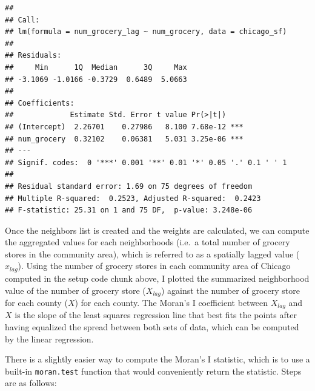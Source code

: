 \documentclass[
]{article}
\newenvironment{Shaded}{\begin{snugshade}}{\end{snugshade}}
\newcommand{\AttributeTok}[1]{\textcolor[rgb]{0.13,0.29,0.53}{#1}}
\newcommand{\CommentTok}[1]{\textcolor[rgb]{0.56,0.35,0.01}{\textit{#1}}}
\newcommand{\ConstantTok}[1]{\textcolor[rgb]{0.56,0.35,0.01}{#1}}
\newcommand{\FunctionTok}[1]{\textcolor[rgb]{0.13,0.29,0.53}{\textbf{#1}}}
\newcommand{\NormalTok}[1]{#1}
\newcommand{\OtherTok}[1]{\textcolor[rgb]{0.56,0.35,0.01}{#1}}
\newcommand{\SpecialCharTok}[1]{\textcolor[rgb]{0.81,0.36,0.00}{\textbf{#1}}}
\begin{document}
\begin{verbatim}
## 
## Call:
## lm(formula = num_grocery_lag ~ num_grocery, data = chicago_sf)
## 
## Residuals:
##     Min      1Q  Median      3Q     Max 
## -3.1069 -1.0166 -0.3729  0.6489  5.0663 
## 
## Coefficients:
##             Estimate Std. Error t value Pr(>|t|)    
## (Intercept)  2.26701    0.27986   8.100 7.68e-12 ***
## num_grocery  0.32102    0.06381   5.031 3.25e-06 ***
## ---
## Signif. codes:  0 '***' 0.001 '**' 0.01 '*' 0.05 '.' 0.1 ' ' 1
## 
## Residual standard error: 1.69 on 75 degrees of freedom
## Multiple R-squared:  0.2523, Adjusted R-squared:  0.2423 
## F-statistic: 25.31 on 1 and 75 DF,  p-value: 3.248e-06
\end{verbatim}

Once the neighbors list is created and the weights are calculated, we
can compute the aggregated values for each neighborhoods (i.e.~a total
number of grocery stores in the community area), which is referred to as
a spatially lagged value (\(x_{lag}\)). Using the number of grocery
stores in each community area of Chicago computed in the setup code
chunk above, I plotted the summarized neighborhood value of the number
of grocery store (\(X_{lag}\)) against the number of grocery store for
each county (\(X\)) for each county. The Moran's I coefficient between
\(X_{lag}\) and \(X\) is the slope of the least squares regression line
that best fits the points after having equalized the spread between both
sets of data, which can be computed by the linear regression.

There is a slightly easier way to compute the Moran's I statistic, which
is to use a built-in \texttt{moran.test} function that would
conveniently return the statistic. Steps are as follows:

\begin{Shaded}
\end{Shaded}
\end{document}
